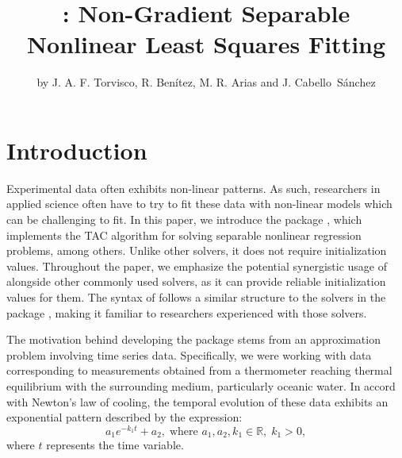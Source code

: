 \title{: Non-Gradient Separable Nonlinear Least Squares Fitting}
\author{by J. A. F. Torvisco, R. Benítez, M. R. Arias and J. Cabello~Sánchez}


\maketitle


\section{Introduction}
Experimental data often exhibits non-linear patterns. As such, researchers in applied science often have to try to fit these data with non-linear models which can be challenging to fit. In this paper, we introduce the  package \citep{package_nlstac}, which implements the TAC algorithm for solving separable nonlinear regression problems, among others. Unlike other solvers, it does not require initialization values. Throughout the paper, we emphasize the potential synergistic usage of  alongside other commonly used solvers, as it can provide reliable initialization values for them. The syntax of  follows a similar structure to the solvers in the  package \citep{package_minpacklm}, making it familiar to researchers experienced with those solvers.

The motivation behind developing the  package stems from an approximation problem involving time series data. Specifically, we were working with data corresponding to measurements obtained from a thermometer reaching thermal equilibrium with the surrounding medium, particularly oceanic water. In accord with Newton's law of cooling, the temporal evolution of these data exhibits an exponential pattern described by the expression:
\begin{equation}\label{eq:pp}
a_1 e^{-k_1t} + a_2, \; \text{where } a_1,a_2,k_1 \in \mathbb{R}, \; k_1>0,
\end{equation}
where $t$ represents the time variable.

